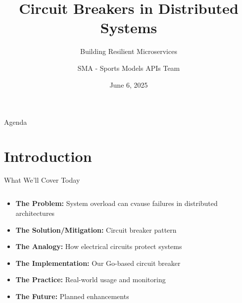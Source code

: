 \documentclass[aspectratio=169]{beamer}
\title[Circuit Breakers]{Circuit Breakers in Distributed Systems}
\subtitle{Building Resilient Microservices}
\author{SMA - Sports Models APIs Team}
\institute{Genius Sports}
\date{June 6, 2025}
\begin{document}
\begin{frame}
    \titlepage
\end{frame}

\begin{frame}{Agenda}
    \tableofcontents
\end{frame}

\section{Introduction}

\begin{frame}{What We'll Cover Today}
    \begin{columns}
        \begin{column}{0.5\textwidth}
            \begin{itemize}
                \item \textbf{The Problem:} System overload can cvause
                      failures in distributed architectures
                \item \textbf{The Solution/Mitigation:} Circuit breaker pattern
                \item \textbf{The Analogy:} How electrical circuits protect systems
                \item \textbf{The Implementation:} Our Go-based circuit breaker
                \item \textbf{The Practice:} Real-world usage and monitoring
                \item \textbf{The Future:} Planned enhancements
            \end{itemize}
        \end{column}
        \begin{column}{0.5\textwidth}
            \begin{center}
            \end{center}
        \end{column}
    \end{columns}
\end{frame}
\end{document}

